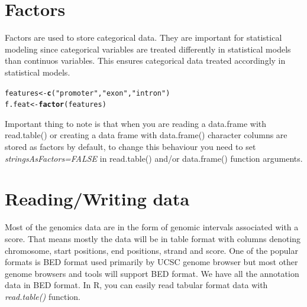 \documentclass[english,nohyper]{tufte-book}\usepackage[]{graphicx}\usepackage[]{color}
\makeatletter
\newcommand{\hlstr}[1]{\textcolor[rgb]{0.192,0.494,0.8}{#1}}%
\newcommand{\hlstd}[1]{\textcolor[rgb]{0.345,0.345,0.345}{#1}}%
\newcommand{\hlkwb}[1]{\textcolor[rgb]{0.69,0.353,0.396}{#1}}%
\newcommand{\hlkwd}[1]{\textcolor[rgb]{0.737,0.353,0.396}{\textbf{#1}}}%
\newenvironment{kframe}{%
 \def\at@end@of@kframe{}%
 \ifinner\ifhmode%
  \def\at@end@of@kframe{\end{minipage}}%
  \begin{minipage}{\columnwidth}%
 \fi\fi%
 \def\FrameCommand##1{\hskip\@totalleftmargin \hskip-\fboxsep
 \colorbox{shadecolor}{##1}\hskip-\fboxsep
     \hskip-\linewidth \hskip-\@totalleftmargin \hskip\columnwidth}%
 \MakeFramed {\advance\hsize-\width
   \@totalleftmargin\z@ \linewidth\hsize
   \@setminipage}}%
 {\par\unskip\endMakeFramed%
 \at@end@of@kframe}
\newenvironment{knitrout}{}{} %
\makeatother
\begin{document}
\section{Factors}

Factors are used to store categorical data. They are important for
statistical modeling since categorical variables are treated differently
in statistical models than continuos variables. This ensures categorical
data treated accordingly in statistical models.

\begin{knitrout}
\color{fgcolor}\begin{kframe}
\begin{alltt}
\hlstd{features} \hlkwb{<-} \hlkwd{c}\hlstd{(}\hlstr{"promoter"}\hlstd{,} \hlstr{"exon"}\hlstd{,} \hlstr{"intron"}\hlstd{)}
\hlstd{f.feat} \hlkwb{<-} \hlkwd{factor}\hlstd{(features)}
\end{alltt}
\end{kframe}
\end{knitrout}



Important thing to note is that when you are reading a data.frame
with read.table() or creating a data frame with data.frame() character
columns are stored as factors by default, to change this behaviour
you need to set \emph{stringsAsFactors=FALSE} in read.table() and/or
data.frame() function arguments.


\section{Reading/Writing data }

Most of the genomics data are in the form of genomic intervals associated
with a score. That means mostly the data will be in table format with
columns denoting chromosome, start positions, end positions, strand
and score. One of the popular formats is BED format used primarily
by UCSC genome browser but most other genome browsers and tools will
support BED format. We have all the annotation data in BED format.
In R, you can easily read tabular format data with \emph{read.table()}
function.
\end{document}
